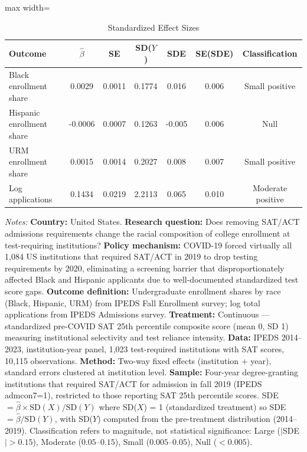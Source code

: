 \begin{table}[htbp]
\centering
\caption{Standardized Effect Sizes}
\label{tab:sde}
\begin{adjustbox}{max width=\textwidth}
\begin{tabular}{lcccccc}
\hline\hline
Outcome & $\hat{\beta}$ & SE & SD($Y$) & SDE & SE(SDE) & Classification \\
\hline
Black enrollment share & 0.0029 & 0.0011 & 0.1774 & 0.016 & 0.006 & Small positive \\
Hispanic enrollment share & -0.0006 & 0.0007 & 0.1263 & -0.005 & 0.006 & Null \\
URM enrollment share & 0.0015 & 0.0014 & 0.2027 & 0.008 & 0.007 & Small positive \\
Log applications & 0.1434 & 0.0219 & 2.2113 & 0.065 & 0.010 & Moderate positive \\
\hline\hline
\end{tabular}
\end{adjustbox}
\begin{tablenotes}[flushleft]
\small
\item \textit{Notes:} \textbf{Country:} United States. \textbf{Research question:} Does removing SAT/ACT admissions requirements change the racial composition of college enrollment at test-requiring institutions? \textbf{Policy mechanism:} COVID-19 forced virtually all 1,084 US institutions that required SAT/ACT in 2019 to drop testing requirements by 2020, eliminating a screening barrier that disproportionately affected Black and Hispanic applicants due to well-documented standardized test score gaps. \textbf{Outcome definition:} Undergraduate enrollment shares by race (Black, Hispanic, URM) from IPEDS Fall Enrollment survey; log total applications from IPEDS Admissions survey. \textbf{Treatment:} Continuous --- standardized pre-COVID SAT 25th percentile composite score (mean 0, SD 1) measuring institutional selectivity and test reliance intensity. \textbf{Data:} IPEDS 2014--2023, institution-year panel, 1,023 test-required institutions with SAT scores, 10,115 observations. \textbf{Method:} Two-way fixed effects (institution + year), standard errors clustered at institution level. \textbf{Sample:} Four-year degree-granting institutions that required SAT/ACT for admission in fall 2019 (IPEDS admcon7=1), restricted to those reporting SAT 25th percentile scores. SDE $= \hat{\beta} \times \text{SD}(X) / \text{SD}(Y)$ where SD($X$) = 1 (standardized treatment) so SDE $= \hat{\beta} / \text{SD}(Y)$, with SD($Y$) computed from the pre-treatment distribution (2014--2019). Classification refers to magnitude, not statistical significance: Large ($|$SDE$| > 0.15$), Moderate ($0.05$--$0.15$), Small ($0.005$--$0.05$), Null ($< 0.005$).
\end{tablenotes}
\end{table}
